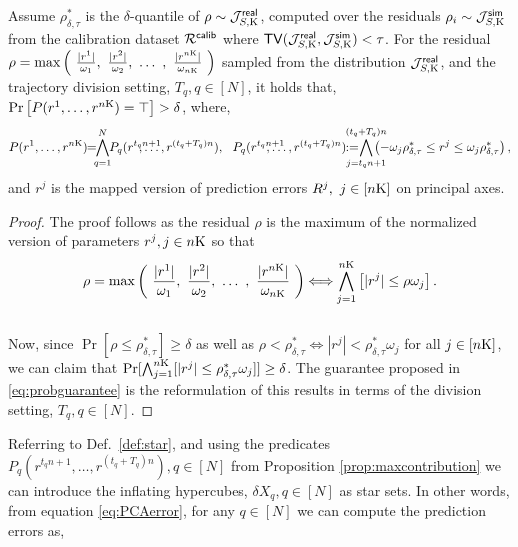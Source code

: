 \begin{proposition}\label{prop:maxcontribution}
Assume $\rho^*_{\delta,\tau}$ is the $\delta$-quantile of $\rho \sim \mathcal{J}_{S,\mathrm{K}}^{\mathsf{real}}$, computed over the residuals $\rho_i \sim \mathcal{J}_{S,\mathrm{K}}^{\mathsf{sim}}$ from the calibration dataset $\mathcal{R}^{\mathsf{calib}}$ where $\mathsf{TV}(\mathcal{J}_{S,\mathrm{K}}^{\mathsf{real}}, \mathcal{J}_{S,\mathrm{K}}^{\mathsf{sim}})<\tau$. For the residual $\rho=  \max \left(\  \frac{|r^1|}{\omega_1} ,\  \frac{|r^2|}{\omega_2} ,\  \ldots \ , \  \frac{|r^{n\horizon}|}{\omega_{n\horizon}}\ \right)$ sampled from the distribution $\mathcal{J}_{S,\mathrm{K}}^{\mathsf{real}}$, and the trajectory division setting, $T_q, q\in[N]$, it holds that, $\Pr\left[ P(r^1,\ldots,r^{n\mathrm{K}}) = \top \right] > \delta$, where,
\vspace{-3mm}
\begin{equation}\label{eq:probguarantee}
P(r^1,\ldots,r^{n\horizon}) \!\! = \!\!\! \bigwedge_{q=1}^{N} \!\! P_q(r^{t_qn+1}\!\!\!\!\!\!\!\!\!\!\!,\ldots,r^{(t_q+T_q)n}),\ \ P_q(r^{t_qn+1}\!\!\!\!\!\!\!\!\!,\ldots,r^{(t_q+T_q)n}) \!\! :=\!\!\!\!\!\!\!\!\bigwedge_{j=t_qn+1}^{(t_q+T_q)n} \!\!\!\!\!\!\!\left(-\omega_j\rho^*_{\delta,\tau}\leq r^j \leq \omega_j\rho^*_{\delta,\tau} \right) ,
\end{equation}
\vspace{-4mm}
and $r^j$ is the mapped version of prediction errors $R^j,\ j\in [n\mathrm{K}]$ on principal axes.
\end{proposition}
\begin{proof}
The proof follows as the residual $\rho$ is the maximum of the normalized version of parameters $r^j, j\in n\mathrm{K}$ so that
\vspace{-3mm}
\begin{equation}
\rho=  \max \left(\  \frac{|r^1|}{\omega_1} ,\  \frac{|r^2|}{\omega_2} ,\  \ldots \ , \  \frac{|r^{n\mathrm{K}}|}{\omega_{n\mathrm{K}}}\ \right)\!\! \iff \!\! \bigwedge_{j=1}^{n\mathrm{K}} \left[ |r^j| \leq \rho \omega_j \right].
\end{equation}
\vspace{-3mm}\\
Now, since $\Pr[ \rho \leq \rho^{*}_{\delta,\tau} ] \geq \delta$ as well as $\rho<\rho^*_{\delta,\tau} \iff |r^j|< \rho^*_{\delta,\tau} \omega_j$ for all $j\in [n\mathrm{K}]$, we can claim that  $\Pr[ \bigwedge_{j=1}^{n\mathrm{K}} [ |r^j| \leq \rho^*_{\delta,\tau} \omega_j ]] \geq \delta$. The guarantee proposed in \eqref{eq:probguarantee} is the reformulation of this results in terms of the division setting, $T_q, q\in [N]$.    
\end{proof}
Referring to Def.~\ref{def:star}, and using the predicates $P_q(r^{t_qn+1}\!\!\!\!\!\!\!\!\!,\ldots,r^{(t_q+T_q)n}), q\in[N]$ from Proposition \ref{prop:maxcontribution} we can introduce the inflating hypercubes, $\delta X_q , q\in [N]$ as star sets. In other words, from equation \eqref{eq:PCAerror}, for any $q\in[N]$ we can compute the prediction errors as,
